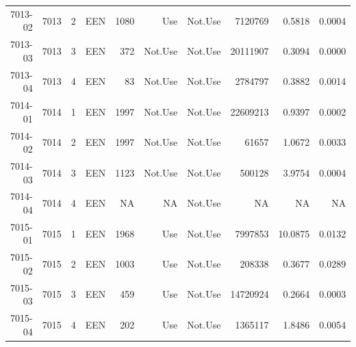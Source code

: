 {\begin{longtable}{ | r | r | r | r | r | r | r | r | r | r | }
7013-02 & 7013 & 2 & EEN & 1080 & Use & Not.Use & 7120769 & 0.5818 & 0.0004\\ 
7013-03 & 7013 & 3 & EEN & 372 & Not.Use & Not.Use & 20111907 & 0.3094 & 0.0000\\ 
7013-04 & 7013 & 4 & EEN & 83 & Not.Use & Not.Use & 2784797 & 0.3882 & 0.0014\\ 
7014-01 & 7014 & 1 & EEN & 1997 & Not.Use & Not.Use & 22609213 & 0.9397 & 0.0002\\ 
7014-02 & 7014 & 2 & EEN & 1997 & Not.Use & Not.Use & 61657 & 1.0672 & 0.0033\\ 
7014-03 & 7014 & 3 & EEN & 1123 & Not.Use & Not.Use & 500128 & 3.9754 & 0.0004\\ 
7014-04 & 7014 & 4 & EEN & NA & NA & Not.Use & NA & NA & NA\\ 
7015-01 & 7015 & 1 & EEN & 1968 & Use & Not.Use & 7997853 & 10.0875 & 0.0132\\ 
7015-02 & 7015 & 2 & EEN & 1003 & Use & Not.Use & 208338 & 0.3677 & 0.0289\\ 
7015-03 & 7015 & 3 & EEN & 459 & Use & Not.Use & 14720924 & 0.2664 & 0.0003\\ 
7015-04 & 7015 & 4 & EEN & 202 & Use & Not.Use & 1365117 & 1.8486 & 0.0054
\end{longtable}
}






